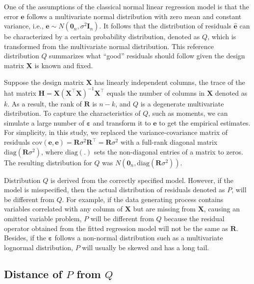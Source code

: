 \documentclass[]{interact}
\theoremstyle{plain}%
\theoremstyle{definition}
\theoremstyle{remark}
\begin{document}
One of the assumptions of the classical normal linear regression model
is that the error \(\boldsymbol{e}\) follows a multivariate normal
distribution with zero mean and constant variance, i.e.,
\(\boldsymbol{e} \sim N(\boldsymbol{0}_n,\sigma^2\boldsymbol{I}_n)\). It
follows that the distribution of residuals \(\hat{\boldsymbol{e}}\) can
be characterized by a certain probability distribution, denoted as
\(Q\), which is transformed from the multivariate normal distribution.
This reference distribution \(Q\) summarizes what ``good'' residuals
should follow given the design matrix \(\boldsymbol{X}\) is known and
fixed.

Suppose the design matrix \(\boldsymbol{X}\) has linearly independent
columns, the trace of the hat matrix
\(\boldsymbol{H} = \boldsymbol{X}(\boldsymbol{X}^\top\boldsymbol{X})^{-1}\boldsymbol{X}^\top\)
equals the number of columns in \(\boldsymbol{X}\) denoted as \(k\). As
a result, the rank of \(\boldsymbol{R}\) is \(n - k\), and \(Q\) is a
degenerate multivariate distribution. To capture the characteristics of
\(Q\), such as moments, we can simulate a large number of
\(\boldsymbol{\varepsilon}\) and transform it to \(\boldsymbol{e}\) to
get the empirical estimates. For simplicity, in this study, we replaced
the variance-covariance matrix of residuals
\(\text{cov}(\boldsymbol{e}, \boldsymbol{e}) = \boldsymbol{R}\sigma^2\boldsymbol{R}^\top = \boldsymbol{R}\sigma^2\)
with a full-rank diagonal matrix
\(\text{diag}(\boldsymbol{R}\sigma^2)\), where \(\text{diag}(.)\) sets
the non-diagonal entries of a matrix to zeros. The resulting
distribution for \(Q\) was
\(N(\boldsymbol{0}_n, \text{diag}(\boldsymbol{R}\sigma^2))\).

Distribution \(Q\) is derived from the correctly specified model.
However, if the model is misspecified, then the actual distribution of
residuals denoted as \(P\), will be different from \(Q\). For example,
if the data generating process contains variables correlated with any
column of \(\boldsymbol{X}\) but are missing from \(\boldsymbol{X}\),
causing an omitted variable problem, \(P\) will be different from \(Q\)
because the residual operator obtained from the fitted regression model
will not be the same as \(\boldsymbol{R}\). Besides, if the
\(\boldsymbol{\varepsilon}\) follows a non-normal distribution such as a
multivariate lognormal distribution, \(P\) will usually be skewed and
has a long tail.

\subsection{\texorpdfstring{Distance of \(P\) from
\(Q\)}{Distance of P from Q}}\label{distance-of-p-from-q}
\end{document}
